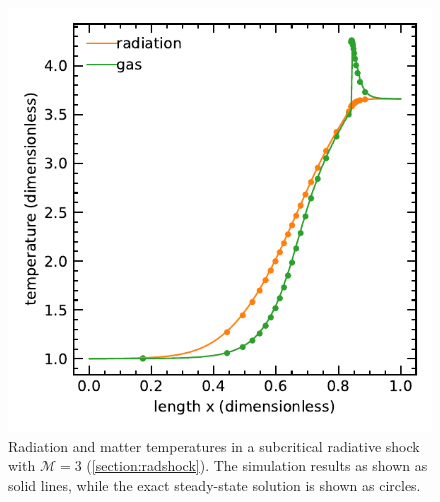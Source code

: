\documentclass[fleqn,usenatbib]{mnras}
\begin{document}
\begin{figure}
    \includegraphics[width=\columnwidth]{radshock_cgs_temperature.pdf}
    \caption{Radiation and matter temperatures in a subcritical radiative shock with $\mathcal{M} = 3$ (\autoref{section:radshock}). The simulation results as shown as solid lines, while the exact steady-state solution is shown as circles.}
    \label{fig:radshock}
\end{figure}
\end{document}
